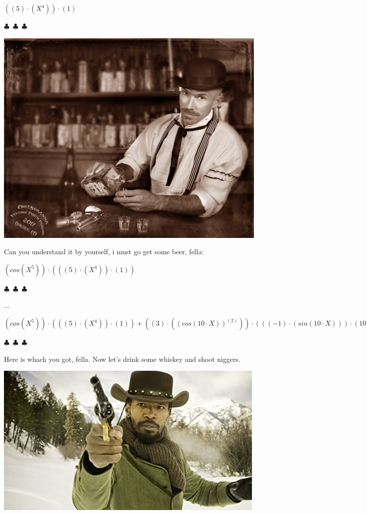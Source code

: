 \documentclass{article}
\begin{document}
\begin{center}$
{{({{({5})}\cdot{({{X}^{4}})}})}\cdot{({1})}}
$\end{center}
\begin{center} $\clubsuit$~$\clubsuit$~$\clubsuit$ \end{center}\begin{center}  \includegraphics[scale=0.3]{funny_pics/bartender.jpg} \end{center}Can you understand it by yourself, i must go get some beer, fella:
\begin{center}$
{{({cos{({{X}^{5}})}})}\cdot{({{({{({5})}\cdot{({{X}^{4}})}})}\cdot{({1})}})}}
$\end{center}
\begin{center} $\clubsuit$~$\clubsuit$~$\clubsuit$ \end{center}...
\begin{center}$
{{{({cos{({{X}^{5}})}})}\cdot{({{({{({5})}\cdot{({{X}^{4}})}})}\cdot{({1})}})}}+{{({{({3})}\cdot{({{({cos{({{10}\cdot{X}})}})}^{({2})}})}})}\cdot{({{({{({-1})}\cdot{({sin{({{10}\cdot{X}})}})}})}\cdot{({10})}})}}}
$\end{center}
\begin{center} $\clubsuit$~$\clubsuit$~$\clubsuit$ \end{center}Here is whach you got, fella. Now let's drink some whiskey and shoot niggers.\begin{center} \includegraphics[scale=0.6]{funny_pics/slave.jpg} \end{center}
\end{document}
